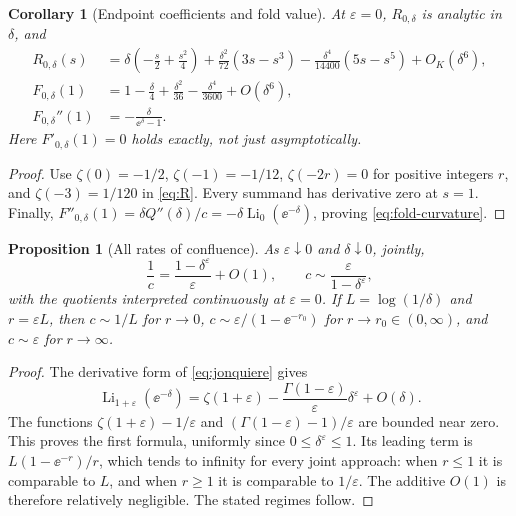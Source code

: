 \documentclass[11pt,a4paper]{article}
\numberwithin{equation}{section}
\newtheorem{proposition}[theorem]{Proposition}
\newtheorem{corollary}[theorem]{Corollary}
\theoremstyle{definition}
\theoremstyle{remark}
\DeclareMathOperator{\Li}{Li}
\newcommand{\ep}{\varepsilon}\newcommand{\la}{\lambda}
\begin{document}
\begin{corollary}[Endpoint coefficients and fold value]\label{cor:normal-zero}
At \(\ep=0\), \(R_{0,\delta}\) is analytic in \(\delta\), and
\begin{align}
 R_{0,\delta}(s)
 &=\delta\left(-\frac{s}{2}+\frac{s^2}{4}\right)
   +\frac{\delta^2}{72}(3s-s^3)
   -\frac{\delta^4}{14400}(5s-s^5)+O_K(\delta^6),\label{eq:Rzero}\\
 F_{0,\delta}(1)
 &=1-\frac\delta4+\frac{\delta^2}{36}
                      -\frac{\delta^4}{3600}+O(\delta^6),\label{eq:fold-value}\\
 F_{0,\delta}''(1)&=-\frac{\delta}{\ee^\delta-1}.
 \label{eq:fold-curvature}
\end{align}
Here \(F'_{0,\delta}(1)=0\) holds exactly, not just asymptotically.
\end{corollary}
\begin{proof}
Use \(\zeta(0)=-1/2\), \(\zeta(-1)=-1/12\),
\(\zeta(-2r)=0\) for positive integers \(r\), and
\(\zeta(-3)=1/120\) in \eqref{eq:R}. Every summand has derivative zero
at \(s=1\). Finally,
\(F''_{0,\delta}(1)=\delta Q''(\delta)/c
=-\delta\Li_0(\ee^{-\delta})\), proving \eqref{eq:fold-curvature}.
\end{proof}

\begin{proposition}[All rates of confluence]\label{prop:rates}
As \(\ep\downarrow0\) and \(\delta\downarrow0\), jointly,
\begin{equation}\label{eq:coupling-uniform}
 \frac1c=\frac{1-\delta^\ep}\ep+O(1),
 \qquad
 c\sim\frac\ep{1-\delta^\ep},
\end{equation}
with the quotients interpreted continuously at \(\ep=0\).
If \(L=\log(1/\delta)\) and \(r=\ep L\), then
\(c\sim1/L\) for \(r\to0\),
\(c\sim\ep/(1-\ee^{-r_0})\) for \(r\to r_0\in(0,\infty)\),
and \(c\sim\ep\) for \(r\to\infty\).
\end{proposition}
\begin{proof}
The derivative form of \eqref{eq:jonquiere} gives
\[
 \Li_{1+\ep}(\ee^{-\delta})
 =\zeta(1+\ep)-\frac{\Gamma(1-\ep)}\ep\delta^\ep+O(\delta).
\]
The functions \(\zeta(1+\ep)-1/\ep\) and
\((\Gamma(1-\ep)-1)/\ep\) are bounded near zero. This proves the first
formula, uniformly since \(0\le\delta^\ep\le1\). Its leading term is
\(L(1-\ee^{-r})/r\), which tends to infinity for every joint approach:
when \(r\le1\) it is comparable to \(L\), and when \(r\ge1\) it is
comparable to \(1/\ep\). The additive \(O(1)\) is therefore relatively
negligible. The stated regimes follow.
\end{proof}
\end{document}
